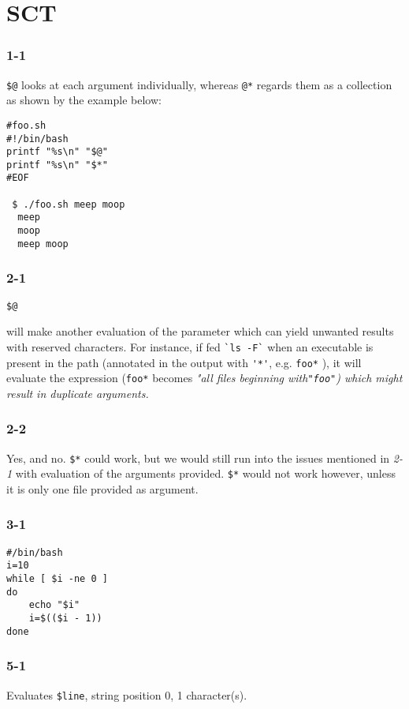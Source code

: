 
\chapter{SCT}
\subsection{1-1}
 \verb=$@= looks at each argument individually, whereas \verb=@*= regards them as a collection as shown by the example below:

\begin{verbatim}
#foo.sh
#!/bin/bash
printf "%s\n" "$@"
printf "%s\n" "$*"
#EOF

 $ ./foo.sh meep moop
  meep
  moop
  meep moop
\end{verbatim}

\subsection{2-1}
\begin{verbatim}$@\end{verbatim} will make another evaluation of the parameter which can yield unwanted results with reserved characters. For instance, if fed \verb=`ls -F`= when an executable is present in the path (annotated in the output with \verb='*'=, e.g. \verb=foo*= ), it will evaluate the expression (\verb=foo*= becomes \em"all files beginning with\em \verb="foo"=) which might result in duplicate arguments.

\subsection{2-2}
Yes, and no. \verb=$*= could work, but we would still run into the issues mentioned in \emph{2-1} with evaluation of the arguments provided. \verb=$*= would not work however, unless it is only one file provided as argument.

\subsection{3-1}
\begin{verbatim}
#/bin/bash
i=10
while [ $i -ne 0 ]
do
    echo "$i"
    i=$(($i - 1))
done
\end{verbatim}

\subsection{5-1}
Evaluates \verb=$line=, string position 0, 1 character(s).


